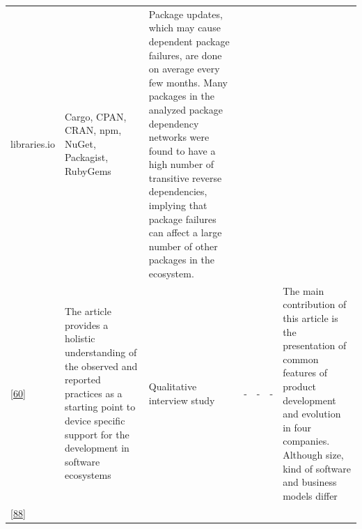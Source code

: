 \documentclass[]{book}
\begin{document}
\begin{longtable}[]{@{}lllllll@{}}
\begin{minipage}[t]{0.10\columnwidth}
libraries.io\strut
\end{minipage} & \begin{minipage}[t]{0.12\columnwidth}\raggedright\strut
Cargo, CPAN, CRAN, npm, NuGet, Packagist, RubyGems\strut
\end{minipage} & \begin{minipage}[t]{0.10\columnwidth}\raggedright\strut
Package updates, which may cause dependent package failures, are done on
average every few months. Many packages in the analyzed package
dependency networks were found to have a high number of transitive
reverse dependencies, implying that package failures can affect a large
number of other packages in the ecosystem.\strut
\end{minipage}\tabularnewline
\begin{minipage}[t]{0.09\columnwidth}\raggedright\strut
{[}\protect\hyperlink{ref-Dittrich2014}{60}{]}\strut
\end{minipage} & \begin{minipage}[t]{0.16\columnwidth}\raggedright\strut
The article provides a holistic understanding of the observed and
reported practices as a starting point to device specific support for
the development in software ecosystems\strut
\end{minipage} & \begin{minipage}[t]{0.17\columnwidth}\raggedright\strut
Qualitative interview study\strut
\end{minipage} & \begin{minipage}[t]{0.07\columnwidth}\raggedright\strut
-\strut
\end{minipage} & \begin{minipage}[t]{0.10\columnwidth}\raggedright\strut
-\strut
\end{minipage} & \begin{minipage}[t]{0.12\columnwidth}\raggedright\strut
-\strut
\end{minipage} & \begin{minipage}[t]{0.10\columnwidth}\raggedright\strut
The main contribution of this article is the presentation of common
features of product development and evolution in four companies.
Although size, kind of software and business models differ\strut
\end{minipage}\tabularnewline
\begin{minipage}[t]{0.09\columnwidth}\raggedright\strut
{[}\protect\hyperlink{ref-Izquierdo2018}{88}{]}\strut
\end{minipage} & \begin{minipage}[t]{0.16\columnwidth}\raggedright\strut

\end{minipage}
\end{longtable}
\end{document}
